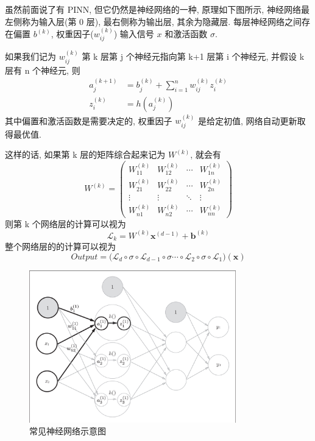 \documentclass[lang=cn,a4paper,newtx]{elegantpaper}
\begin{document}
\begin{definition}
    虽然前面说了有 PINN, 但它仍然是神经网络的一种, 原理如下图所示, 神经网络最左侧称为输入层(第 0 层), 最右侧称为输出层, 其余为隐藏层. 每层神经网络之间存在偏置 $ b^{(k)} $, 权重因子($w_{ij}^{(k)}$) 输入信号 $ x $ 和激活函数 $ \sigma $.

    如果我们记为 $w_{ij}^{(k)}$ 第 k 层第 j 个神经元指向第 k+1 层第 i 个神经元, 并假设 k 层有 n 个神经元, 则 
    \begin{equation}
        \begin{aligned}
         a_{j}^{(k+1)} &= b_{j}^{(k)} + \sum_{i=1}^{n}w_{ij}^{(k)}z_{i}^{(k)} \\
         z_{i}^{(k)} &= h(a_{j}^{(k)})           
        \end{aligned}
    \end{equation}
    其中偏置和激活函数是需要决定的, 权重因子 $ w_{ij}^{(k)} $ 是给定初值, 网络自动更新取得最优值. 

    这样的话, 如果第 k 层的矩阵综合起来记为 $ W^{(k)} $, 就会有
    \begin{equation} W^{(k)} = 
        \begin{pmatrix}
            W_{11}^{(k)} &  W_{12}^{(k)} & \cdots & W_{1n}^{(k)} \\
            W_{21}^{(k)} &  W_{22}^{(k)} & \cdots & W_{2n}^{(k)} \\
            \vdots & \vdots & \ddots & \vdots \\
            W_{n1}^{(k)} &  W_{n2}^{(k)} & \cdots & W_{nn}^{(k)}
        \end{pmatrix}
    \end{equation}
    则第 k 个网络层的计算可以视为 
    \begin{equation}
        \mathcal{L}_k = W^{(k)}\textbf{x}^{(d-1)} + \textbf{b}^{(k)}
    \end{equation}
    整个网络层的的计算可以视为
    \begin{equation}
             Output = \big( \mathcal{L}_d \circ \sigma \circ \mathcal{L}_{d-1} \circ \sigma \cdots \circ \mathcal{L}_{2} \circ \sigma \circ \mathcal{L}_{1} \big) (\textbf{x})    
    \end{equation}
\end{definition}
\begin{figure}[!htbp]
    \centering
    \includegraphics[width=0.8\textwidth]{images/neural-network.png}
    \caption{常见神经网络示意图}
    \label{fig:neural-network}
\end{figure}
\end{document}

